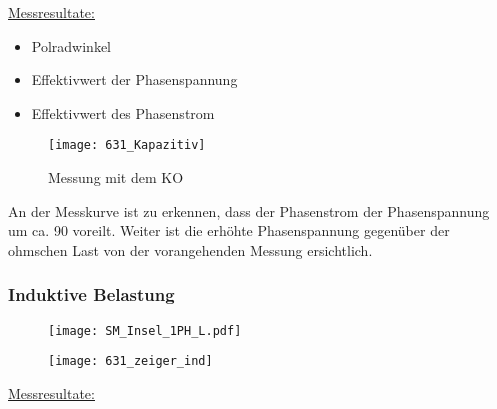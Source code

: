 \begin{flushleft}
\underline{Messresultate:}\\
\vspace{0.3cm}


\begin{itemize}
\item \makebox[5cm][l]{$\varphi = 1.4\degree$  }            Polradwinkel
\item {}         Effektivwert der Phasenspannung
\item {}        Effektivwert des Phasenstrom    
\end{itemize}

\vspace{0.3cm}

\begin{figure}[H]
    \centering
    \texttt{[image: 631\_Kapazitiv]}
    \caption{Messung mit dem KO}
    \label{fig:U/I_C}
\end{figure}

An der Messkurve ist zu erkennen, dass der Phasenstrom der Phasenspannung um ca. 90 \degree voreilt. Weiter ist die erhöhte Phasenspannung gegenüber der ohmschen Last von der vorangehenden Messung ersichtlich. 









\newpage




\subsubsection{Induktive Belastung}

\begin{figure}[H]
\begin{minipage}[t]{0.65\textwidth}
\centering
\texttt{[image: SM\_Insel\_1PH\_L.pdf]}
\label{fig:SM_Insel_1PH_L}
\end{minipage}
\begin{minipage}[t]{0.3\textwidth}
\centering
\texttt{[image: 631\_zeiger\_ind]}
    \label{fig:ZeigerL}
\end{minipage}
\end{figure}


\underline{Messresultate:}\\
\vspace{0.3cm}



\end{flushleft}
